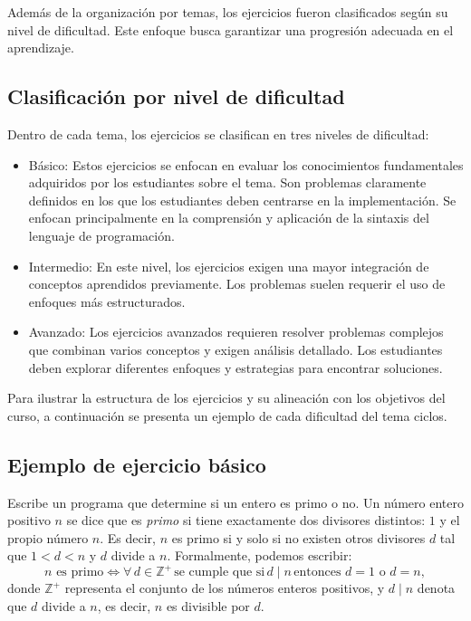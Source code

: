 \documentclass{article}
\begin{document}
Además de la organización por temas, los ejercicios fueron clasificados según su nivel de dificultad. Este enfoque busca garantizar una progresión adecuada en el aprendizaje.

\subsection{Clasificación por nivel de dificultad}  
Dentro de cada tema, los ejercicios se clasifican en tres niveles de dificultad:  
\begin{itemize}  
    \item Básico: Estos ejercicios se enfocan en evaluar los conocimientos fundamentales adquiridos por los estudiantes sobre el tema. Son problemas claramente definidos en los que los estudiantes deben centrarse en la implementación. Se enfocan principalmente en la comprensión y aplicación de la sintaxis del lenguaje de programación.
    \item Intermedio: En este nivel, los ejercicios exigen una mayor integración de conceptos aprendidos previamente. Los problemas suelen requerir el uso de enfoques más estructurados. 
    \item Avanzado: Los ejercicios avanzados requieren resolver problemas complejos que combinan varios conceptos y exigen análisis detallado. Los estudiantes deben explorar diferentes enfoques y estrategias para encontrar soluciones.
\end{itemize}

Para ilustrar la estructura de los ejercicios y su alineación con los objetivos del curso, a continuación se presenta un ejemplo de cada dificultad del tema ciclos.

\subsection*{Ejemplo de ejercicio básico}

Escribe un programa que determine si un entero es primo o no. Un número entero positivo \( n \) se dice que es \textit{primo} si tiene exactamente dos divisores distintos: \( 1 \) y el propio número \( n \). Es decir, \( n \) es primo si y solo si no existen otros divisores \( d \) tal que \( 1 < d < n \) y \( d \) divide a \( n \). Formalmente, podemos escribir:
\[
n \text{ es primo} \iff  \forall \, d \in \mathbb{Z}^+ \, \text{se cumple que si} \, d \mid n \, \text{entonces } d = 1 \text{ o } d = n,
\]
donde \( \mathbb{Z}^+ \) representa el conjunto de los números enteros positivos, y \( d \mid n \) denota que \( d \) divide a \( n \), es decir, \( n \) es divisible por \( d \).\\
\end{document}
